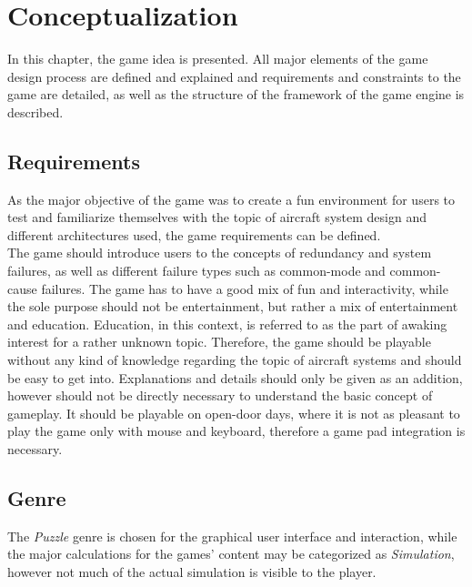 
\chapter{Conceptualization}\label{ch:design}
In this chapter, the game idea is presented.
All major elements of the game design process are defined and explained and requirements and constraints to the game are detailed, as well as
the structure of the framework of the game engine is described.

\section{Requirements}\label{sec:requirements}
As the major objective of the game was to create a fun environment for users to test and familiarize themselves with the topic of
aircraft system design and different architectures used, the game requirements can be defined.
\\
The game should introduce users to the concepts of redundancy and system failures, as well as different failure types such
as common-mode and common-cause failures.
The game has to have a good mix of fun and interactivity, while the sole purpose should not be entertainment, but rather a
mix of entertainment and education.
Education, in this context, is referred to as the part of awaking interest for a rather unknown topic.
Therefore, the game should be playable without any kind of knowledge regarding the topic of aircraft systems and should be easy
to get into.
Explanations and details should only be given as an addition, however should not be directly necessary to understand the basic concept
of gameplay.
It should be playable on open-door days, where it is not as pleasant to play the game only with mouse and keyboard, therefore a game pad
integration is necessary.

\section{Genre}\label{sec:genre}
The \textit{Puzzle} genre is chosen for the graphical user interface and interaction, while the major calculations for the
games' content may be categorized as \textit{Simulation}, however not much of the actual simulation is visible to the player.

